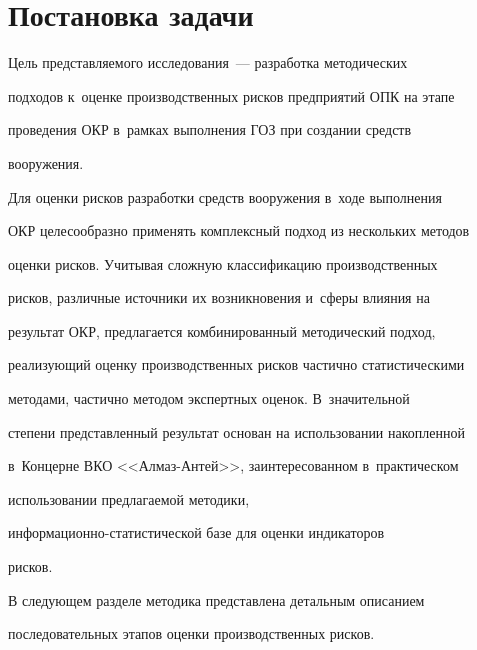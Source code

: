 \vspace*{-3pt}


     


\section{Постановка задачи }





\vspace*{-3pt}





     Цель представляемого исследования~--- разработка методических 


подходов к~оценке производственных рисков предприятий ОПК на этапе 


проведения ОКР в~рамках выполнения ГОЗ при создании средств 


вооружения.


     


     Для оценки рисков разработки средств вооружения в~ходе выполнения 


ОКР целесообразно применять комплексный подход из нескольких методов 


оценки рисков. Учитывая сложную классификацию производственных 


рисков, различные источники их возникновения и~сферы влияния на 


результат ОКР, предлагается комбинированный методический подход, 


реализующий оценку производственных рисков частично статистическими 


методами, частично методом экспертных оценок. В~значительной 


степени представленный результат основан на использовании накопленной 


в~Концерне ВКО <<Алмаз-Антей>>, заинтересованном в~практическом 


использовании предлагаемой методики,  


ин\-фор\-ма\-ци\-он\-но-ста\-ти\-сти\-че\-ской базе для оценки индикаторов 


рисков.


     


     В следующем разделе методика представлена детальным описанием 


последовательных этапов оценки производственных рисков.





